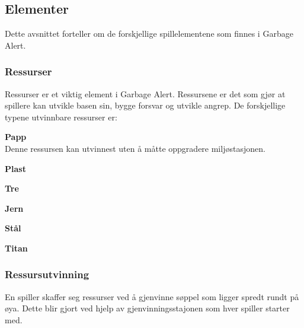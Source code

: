 

\subsection{Elementer}
Dette avsnittet forteller om de forskjellige spillelementene som finnes
i Garbage Alert.
\subsubsection{Ressurser}
Ressurser er et viktig element i Garbage Alert. Ressursene er det som
gjør at spillere kan utvikle basen sin, bygge forsvar og utvikle angrep.
De forskjellige typene utvinnbare ressurser er:
\begin{description}
	\item \textbf{Papp}\\ Denne ressursen kan utvinnest uten å måtte
oppgradere miljøstasjonen.
	\item \textbf{Plast}
	\item \textbf{Tre}
	\item \textbf{Jern}
	\item \textbf{Stål}
	\item \textbf{Titan}
\end{description}
\subsubsection{Ressursutvinning}
En spiller skaffer seg ressurser ved å gjenvinne søppel som ligger
spredt rundt på øya. Dette blir gjort ved hjelp av gjenvinningsstajonen
som hver spiller starter med.
